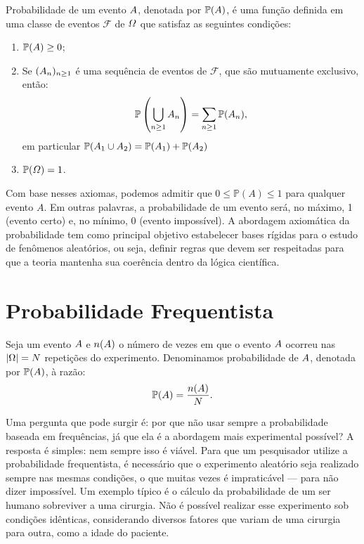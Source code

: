 Probabilidade de um evento $\mathnormal{A}$, denotada por $\mathbb{P}(\mathnormal{A})$,  é uma função definida em uma classe de eventos $\mathcal{F}$ de $\mathnormal{\Omega}$ que satisfaz as seguintes condições:	
	\begin{enumerate}
		\item[(i)] $\mathbb{P}(\mathnormal{A}) \geq 0$;
		\item[(ii)] Se $(\mathnormal{A_n})_{\mathnormal{n} \geq 1}$ é uma sequência de eventos de $\mathcal{F}$, que são mutuamente exclusivo, então:
		\begin{equation*}	        \mathbb{P}\left(\bigcup_{\mathnormal{n}\geq 1}\mathnormal{A_n}\right) =  \displaystyle \sum_{\mathnormal{n}\geq 1} \mathbb{P}(\mathnormal{A_n}), 
			\end{equation*}
			em particular $\mathbb{P}(\mathnormal{A}_1 \cup \mathnormal{A}_2) = \mathbb{P}(\mathnormal{A}_1) + \mathbb{P}(\mathnormal{A}_2)$
			\item[(iii)] $\mathbb{P}(\mathnormal{\Omega}) = 1$.
		\end{enumerate}
\inic Com base nesses axiomas, podemos admitir que $0 \leq \mathbb{P}(A) \leq 1$ para qualquer evento $A$. Em outras palavras, a probabilidade de um evento será, no máximo, 1 (evento certo) e, no mínimo, 0 (evento impossível). A abordagem axiomática da probabilidade tem como principal objetivo estabelecer bases rígidas para o estudo de fenômenos aleatórios, ou seja, definir regras que devem ser respeitadas para que a teoria mantenha sua coerência dentro da lógica científica.


\section{Probabilidade Frequentista}

Seja um evento $\mathnormal{A}$ e $\mathnormal{n(A)}$ o número de vezes em que o evento $\mathnormal{A}$ ocorreu nas $|\Omega|=\mathnormal{N}$ repetições do experimento. Denominamos probabilidade de $\mathnormal{A}$, denotada por $\mathbb{P}(\mathnormal{A})$, à razão: 
	\begin{equation*}
			\mathbb{P}(\mathnormal{A}) = \frac{\mathnormal{n(A)}}{\mathnormal{N}}.
		\end{equation*}
        
	Uma pergunta que pode surgir é: por que não usar sempre a probabilidade baseada em frequências, já que ela é a abordagem mais experimental possível? A resposta é simples: nem sempre isso é viável. Para que um pesquisador utilize a probabilidade frequentista, é necessário que o experimento aleatório seja realizado sempre nas mesmas condições, o que muitas vezes é impraticável — para não dizer impossível. Um exemplo típico é o cálculo da probabilidade de um ser humano sobreviver a uma cirurgia. Não é possível realizar esse experimento sob condições idênticas, considerando diversos fatores que variam de uma cirurgia para outra, como a idade do paciente.

